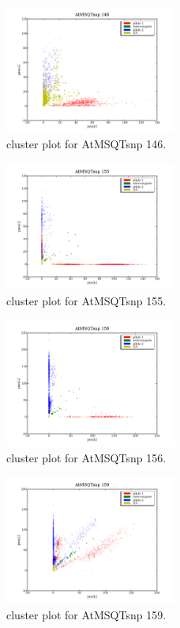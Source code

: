 \begin{figure}[H]
\includegraphics[width=0.5\textwidth]{figures/cluster_plot_AtMSQTsnp_146.png}
\caption{cluster plot for AtMSQTsnp 146.} \label{flAtMSQTsnp146}
\end{figure}
\begin{figure}[H]
\includegraphics[width=0.5\textwidth]{figures/cluster_plot_AtMSQTsnp_155.png}
\caption{cluster plot for AtMSQTsnp 155.} \label{flAtMSQTsnp155}
\end{figure}
\begin{figure}[H]
\includegraphics[width=0.5\textwidth]{figures/cluster_plot_AtMSQTsnp_156.png}
\caption{cluster plot for AtMSQTsnp 156.} \label{flAtMSQTsnp156}
\end{figure}
\begin{figure}[H]
\includegraphics[width=0.5\textwidth]{figures/cluster_plot_AtMSQTsnp_159.png}
\caption{cluster plot for AtMSQTsnp 159.} \label{flAtMSQTsnp159}
\end{figure}
